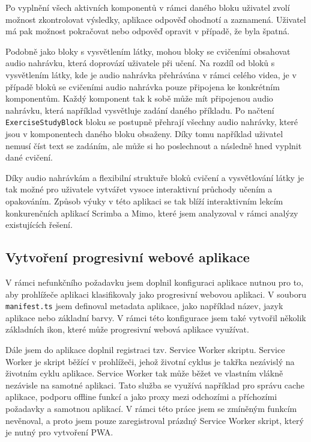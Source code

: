 Po vyplnění všech aktivních komponentů v rámci daného bloku uživatel zvolí možnost zkontrolovat výsledky, aplikace odpověď ohodnotí a zaznamená. Uživatel má pak možnost pokračovat nebo odpověď opravit v případě, že byla špatná.

Podobně jako bloky s vysvětlením látky, mohou bloky se cvičeními obsahovat audio nahrávku, která doprovází uživatele při učení. Na rozdíl od bloků s vysvětlením látky, kde je audio nahrávka přehrávána v rámci celého videa, je v případě bloků se cvičeními audio nahrávka pouze připojena ke konkrétním komponentům. Každý komponent tak k sobě může mít připojenou audio nahrávku, která například vysvětluje zadání daného příkladu. Po načtení \texttt{ExerciseStudyBlock} bloku se postupně přehrají všechny audio nahrávky, které jsou v komponentech daného bloku obsaženy. Díky tomu například uživatel nemusí číst text se zadáním, ale může si ho poslechnout a následně hned vyplnit dané cvičení.

Díky audio nahrávkám a flexibilní struktuře bloků cvičení a vysvětlování látky je tak možné pro uživatele vytvářet vysoce interaktivní průchody učením a opakováním. Způsob výuky v této aplikaci se tak blíží interaktivním lekcím konkurenčních aplikací Scrimba a Mimo, které jsem analyzoval v rámci analýzy existujících řešení.

\subsection{Vytvoření progresivní webové aplikace}

V rámci nefunkčního požadavku jsem doplnil konfiguraci aplikace nutnou pro to, aby prohlížeče aplikaci klasifikovaly jako progresivní webovou aplikaci. V souboru \texttt{manifest.ts} jsem definoval metadata aplikace, jako například název, jazyk aplikace nebo základní barvy. V rámci této konfigurace jsem také vytvořil několik základních ikon, které může progresivní webová aplikace využívat.

Dále jsem do aplikace doplnil registraci tzv. Service Worker skriptu. Service Worker je skript běžící v prohlížeči, jehož životní cyklus je takřka nezávislý na životním cyklu aplikace. Service Worker tak může běžet ve vlastním vlákně nezávisle na samotné aplikaci. Tato služba se využívá například pro správu cache aplikace, podporu offline funkcí a jako proxy mezi odchozími a příchozími požadavky a samotnou aplikací. V rámci této práce jsem se zmíněným funkcím nevěnoval, a proto jsem pouze zaregistroval prázdný Service Worker skript, který je nutný pro vytvoření PWA. \cite{ServiceWorker}

